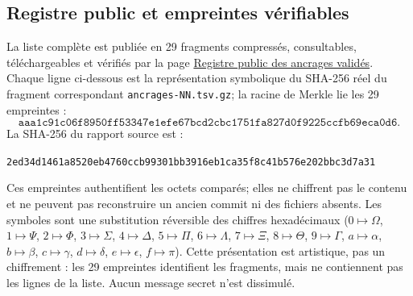 \documentclass[11pt,a4paper]{article}
\begin{document}
\subsection*{Registre public et empreintes vérifiables}
La liste complète est publiée en 29 fragments compressés, consultables,
téléchargeables et vérifiés par la page
\href{https://2racinede4carreunivers-dev.github.io/Analyse-de-la-g-om-trie-du-spectre-des-nombres-premiers/}
{Registre public des ancrages validés}.
Chaque ligne ci-dessous est la représentation symbolique du SHA-256 réel du
fragment correspondant \texttt{ancrages-NN.tsv.gz}; la racine de Merkle lie
les 29 empreintes :
\[
\texttt{aaa1c91c06f8950ff53347e1efe67bcd2cbc1751fa827d0f9225ccfb69eca0d6}.
\]
La SHA-256 du rapport source est :
\begin{center}\small
\texttt{2ed34d1461a8520eb4760ccb99301bb3916eb1ca35f8c41b576e202bbc3d7a31}
\end{center}
Ces empreintes authentifient les octets comparés; elles ne chiffrent pas le
contenu et ne peuvent pas reconstruire un ancien commit ni des fichiers absents.
Les symboles sont une substitution réversible des chiffres hexadécimaux
($0\mapsto\Omega$, $1\mapsto\Psi$, $2\mapsto\Phi$, $3\mapsto\Sigma$,
$4\mapsto\Delta$, $5\mapsto\Pi$, $6\mapsto\Lambda$, $7\mapsto\Xi$,
$8\mapsto\Theta$, $9\mapsto\Gamma$, $a\mapsto\alpha$, $b\mapsto\beta$,
$c\mapsto\gamma$, $d\mapsto\delta$, $e\mapsto\epsilon$, $f\mapsto\pi$).
Cette présentation est artistique, pas un chiffrement : les 29 empreintes
identifient les fragments, mais ne contiennent pas les lignes de la liste.
Aucun message secret n'est dissimulé.
\end{document}
